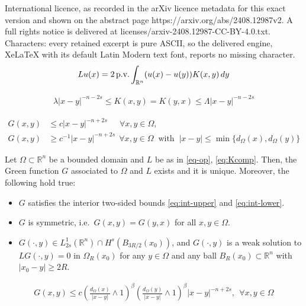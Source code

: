 \documentclass[10pt,a4paper]{amsart}
\newcommand{\R}{\mathbb{R}}
\renewcommand{\d}{\textnormal{\,d}}
\begin{document}
International licence, as recorded in the arXiv licence metadata for this exact version and shown on the abstract page https://arxiv.org/abs/2408.12987v2. A full rights notice is delivered at licenses/arxiv-2408.12987-CC-BY-4.0.txt. Characters: every retained excerpt is pure ASCII, so the delivered engine, XeLaTeX with its default Latin Modern text font, reports no missing character.
\begin{align}\label{eq-op}
Lu(x) = 2\, \text{p.v.} \int_{\R^n} (u(x) - u(y)) K(x,y) \d y
\end{align}

\begin{align}
\label{eq:Kcomp}
\lambda |x-y|^{-n-2s} \le K(x,y) = K(y,x) \le \Lambda |x-y|^{-n-2s} 
\end{align}

\begin{align}
\label{eq:int-upper}
    G(x,y) &\le c |x-y|^{-n+2s} ~~\quad \forall x,y \in \Omega,\\
    \label{eq:int-lower}
    G(x,y) &\ge c^{-1} |x-y|^{-n+2s} ~~ \forall x,y \in \Omega ~\text{ with } ~ |x-y| \le \min\{ d_{\Omega}(x) , d_{\Omega}(y) \}
\end{align}

\begin{lemma}
\label{lemma:Green-aux}
    Let $\Omega \subset \R^n$ be a bounded domain and $L$ be as in \eqref{eq-op}, \eqref{eq:Kcomp}. Then, the Green function $G$ associated to $\Omega$ and $L$ exists and it is unique. Moreover, the following hold true:
    \begin{itemize}
        \item $G$ satisfies the interior two-sided bounds \eqref{eq:int-upper} and \eqref{eq:int-lower}.
        \item $G$ is symmetric, i.e.\ $G(x,y) = G(y,x)$ for all $x,y \in \Omega$.
        \item $G(\cdot,y) \in L^1_{2s}(\R^n) \cap H^s(B_{3R/2}(x_0))$, and $G(\cdot,y)$ is a weak solution to $L G(\cdot,y) = 0$ in $\Omega_R(x_0)$ for any $y \in \Omega$ and any ball $B_R(x_0) \subset \R^n$ with $|x_0 - y| \ge 2R$.
    \end{itemize}
\end{lemma}

\begin{align}
\label{eq:Green-boundary}
G(x,y) \le c \left( \frac{d_{\Omega}(x)}{|x-y|} \wedge 1 \right)^{\beta}\left( \frac{d_{\Omega}(y)}{|x-y|} \wedge 1 \right)^{\beta} |x-y|^{-n+2s}, ~~ \forall x,y \in \Omega
\end{align}
\end{document}

